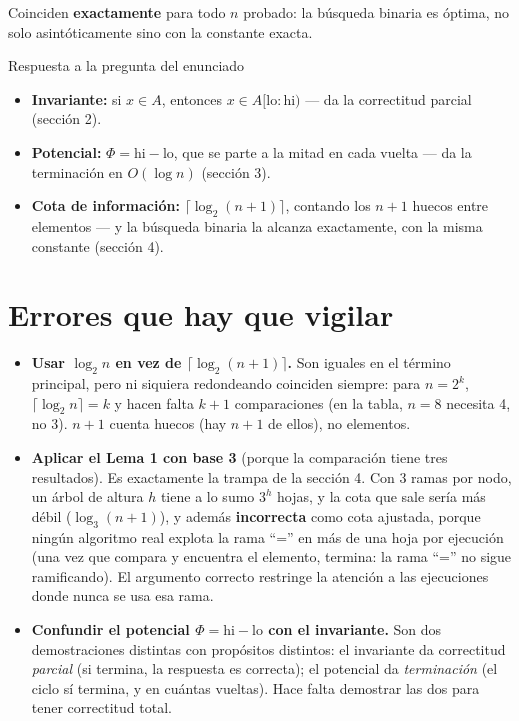 \documentclass[11pt]{article}
\begin{document}
Coinciden \textbf{exactamente} para todo $n$ probado: la búsqueda binaria es óptima, no solo asintóticamente
sino con la constante exacta.

\begin{resultado}{Respuesta a la pregunta del enunciado}
\begin{itemize}[leftmargin=14pt]
\item \textbf{Invariante:} si $x\in A$, entonces $x\in A[\mathrm{lo}:\mathrm{hi})$ --- da la correctitud
parcial (sección 2).
\item \textbf{Potencial:} $\Phi=\mathrm{hi}-\mathrm{lo}$, que se parte a la mitad en cada vuelta --- da la
terminación en $O(\log n)$ (sección 3).
\item \textbf{Cota de información:} $\lceil\log_2(n{+}1)\rceil$, contando los $n{+}1$ huecos entre
elementos --- y la búsqueda binaria la alcanza exactamente, con la misma constante (sección 4).
\end{itemize}
\end{resultado}

\section*{Errores que hay que vigilar}

\begin{alerta}{}
\begin{itemize}[leftmargin=14pt]
\item \textbf{Usar $\log_2 n$ en vez de $\lceil\log_2(n{+}1)\rceil$.} Son iguales en el término principal,
pero ni siquiera redondeando coinciden siempre: para $n=2^k$, $\lceil\log_2 n\rceil=k$ y hacen falta $k{+}1$
comparaciones (en la tabla, $n=8$ necesita 4, no 3). $n{+}1$ cuenta huecos (hay $n{+}1$ de ellos), no
elementos.
\item \textbf{Aplicar el Lema 1 con base 3} (porque la comparación tiene tres resultados). Es exactamente
la trampa de la sección 4. Con 3 ramas por nodo, un árbol de altura $h$ tiene a lo sumo $3^h$ hojas, y la
cota que sale sería más débil ($\log_3(n{+}1)$), y además \textbf{incorrecta} como cota ajustada, porque
ningún algoritmo real explota la rama ``='' en más de una hoja por ejecución (una vez que compara y
encuentra el elemento, termina: la rama ``='' no sigue ramificando). El argumento correcto restringe la
atención a las ejecuciones donde nunca se usa esa rama.
\item \textbf{Confundir el potencial $\Phi=\mathrm{hi}-\mathrm{lo}$ con el invariante.} Son dos
demostraciones distintas con propósitos distintos: el invariante da correctitud \emph{parcial} (si
termina, la respuesta es correcta); el potencial da \emph{terminación} (el ciclo sí termina, y en cuántas
vueltas). Hace falta demostrar las dos para tener correctitud total.
\end{itemize}
\end{alerta}
\end{document}
